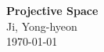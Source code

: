 \documentclass[11pt,openany]{article}
\begin{document}
\begin{center}
	\huge\textbf{Projective Space}\\
	\vspace{0.5em}
	\large{Ji, Yong-hyeon}\\
	\vspace{0.5em}
	\normalsize{\today}\\
\end{center}
%		
%		
%		
\end{document}
